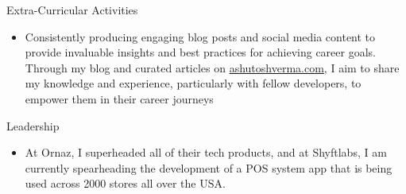 \documentclass{resume} %
\begin{document}

\begin{rSection}{Extra-Curricular Activities} 
	\begin{itemize}
		\item Consistently producing engaging blog posts and social media content to provide invaluable insights and best practices for achieving career goals. Through my blog and curated articles on \href{https://ashutoshverma.com/}{ashutoshverma.com}, I aim to share my knowledge and experience, particularly with fellow developers, to empower them in their career journeys
	\end{itemize}
\end{rSection}

\begin{rSection}{Leadership} 
	\begin{itemize}
		\item At Ornaz, I superheaded all of their tech products, and at Shyftlabs, I am currently spearheading the development of a POS system app that is being used across 2000 stores all over the USA.
	\end{itemize}
		
		
\end{rSection}
\end{document}
